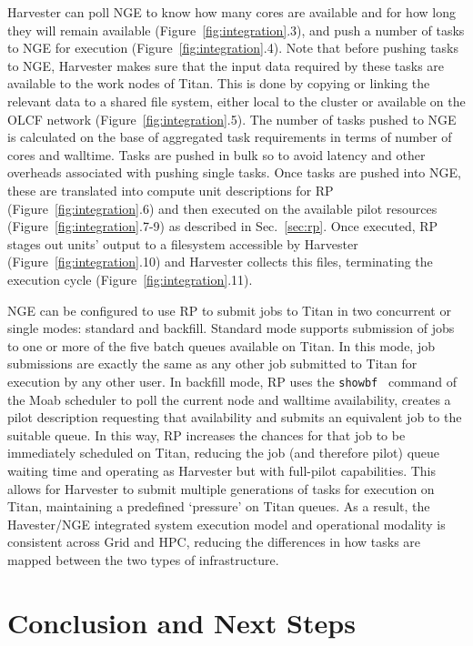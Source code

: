 \documentclass{webofc}
\begin{document}
Harvester can poll NGE to know how many cores are available and for how long
they will remain available (Figure~\ref{fig:integration}.3), and push a
number of tasks to NGE for execution (Figure~\ref{fig:integration}.4). Note
that before pushing tasks to NGE, Harvester makes sure that the input data
required by these tasks are available to the work nodes of Titan. This is
done by copying or linking the relevant data to a shared file system, either
local to the cluster or available on the OLCF network
(Figure~\ref{fig:integration}.5). The number of tasks pushed to NGE is
calculated on the base of aggregated task requirements in terms of number of
cores and walltime. Tasks are pushed in bulk so to avoid latency and other
overheads associated with pushing single tasks. Once tasks are pushed into
NGE, these are translated into compute unit descriptions for RP
(Figure~\ref{fig:integration}.6) and then executed on the available pilot
resources (Figure~\ref{fig:integration}.7-9) as described in
Sec.~\ref{sec:rp}. Once executed, RP stages out units' output to a filesystem
accessible by Harvester (Figure~\ref{fig:integration}.10) and Harvester
collects this files, terminating the execution cycle
(Figure~\ref{fig:integration}.11).

NGE can be configured to use RP to submit jobs to Titan in two concurrent or
single modes: standard and backfill. Standard mode supports submission of
jobs to one or more of the five batch queues available on Titan. In this
mode, job submissions are exactly the same as any other job submitted to
Titan for execution by any other user. In backfill mode, RP uses the
\texttt{showbf}~\cite{showbf} command of the Moab scheduler to poll the
current node and walltime availability, creates a pilot description
requesting that availability and submits an equivalent job to the suitable
queue. In this way, RP increases the chances for that job to be immediately
scheduled on Titan, reducing the job (and therefore pilot) queue waiting time
and operating as Harvester but with full-pilot capabilities. This allows for
Harvester to submit multiple generations of tasks for execution on Titan,
maintaining a predefined ‘pressure’ on Titan queues. As a result, the
Havester/NGE integrated system execution model and operational modality is
consistent across Grid and HPC, reducing the differences in how tasks are
mapped between the two types of infrastructure.


\section{Conclusion and Next Steps}
\end{document}
